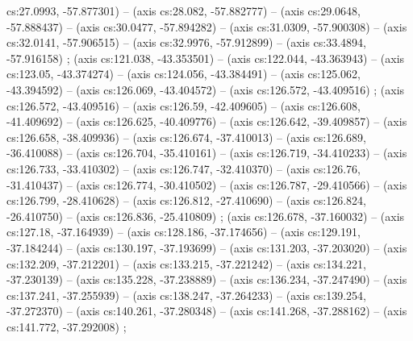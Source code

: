   cs:27.0993, -57.877301) -- (axis cs:28.082, -57.882777) -- (axis cs:29.0648,
  -57.888437) -- (axis cs:30.0477, -57.894282) -- (axis cs:31.0309,
  -57.900308) -- (axis cs:32.0141, -57.906515) -- (axis cs:32.9976,
  -57.912899) -- (axis cs:33.4894, -57.916158) ; 
  (axis cs:121.038, -43.353501) -- (axis cs:122.044, -43.363943) -- (axis
  cs:123.05, -43.374274) -- (axis cs:124.056, -43.384491) -- (axis cs:125.062,
  -43.394592) -- (axis cs:126.069, -43.404572) -- (axis cs:126.572,
  -43.409516) ;  (axis cs:126.572, -43.409516) --
  (axis cs:126.59, -42.409605) -- (axis cs:126.608, -41.409692) -- (axis
  cs:126.625, -40.409776) -- (axis cs:126.642, -39.409857) -- (axis
  cs:126.658, -38.409936) -- (axis cs:126.674, -37.410013) -- (axis
  cs:126.689, -36.410088) -- (axis cs:126.704, -35.410161) -- (axis
  cs:126.719, -34.410233) -- (axis cs:126.733, -33.410302) -- (axis
  cs:126.747, -32.410370) -- (axis cs:126.76, -31.410437) -- (axis cs:126.774,
  -30.410502) -- (axis cs:126.787, -29.410566) -- (axis cs:126.799,
  -28.410628) -- (axis cs:126.812, -27.410690) -- (axis cs:126.824,
  -26.410750) -- (axis cs:126.836, -25.410809) ; 
  (axis cs:126.678, -37.160032) -- (axis cs:127.18, -37.164939) -- (axis
  cs:128.186, -37.174656) -- (axis cs:129.191, -37.184244) -- (axis
  cs:130.197, -37.193699) -- (axis cs:131.203, -37.203020) -- (axis
  cs:132.209, -37.212201) -- (axis cs:133.215, -37.221242) -- (axis
  cs:134.221, -37.230139) -- (axis cs:135.228, -37.238889) -- (axis
  cs:136.234, -37.247490) -- (axis cs:137.241, -37.255939) -- (axis
  cs:138.247, -37.264233) -- (axis cs:139.254, -37.272370) -- (axis
  cs:140.261, -37.280348) -- (axis cs:141.268, -37.288162) -- (axis
  cs:141.772, -37.292008) ;
  

